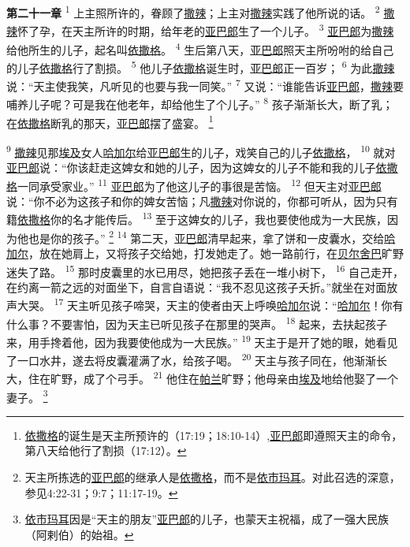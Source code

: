 \textbf{第二十一章\quad}
\textsuperscript{1}
上主照所许的，眷顾了\uline{撒辣}；上主对\uline{撒辣}实践了他所说的话。
\textsuperscript{2}
\uline{撒辣}怀了孕，在天主所许的时期，给年老的\uline{亚巴郎}生了一个儿子。
\textsuperscript{3}
\uline{亚巴郎}为\uline{撒辣}给他所生的儿子，起名叫\uline{依撒格}。
\textsuperscript{4}
生后第八天，\uline{亚巴郎}照天主所吩咐的给自己的儿子\uline{依撒格}行了割损。
\textsuperscript{5}
他儿子\uline{依撒格}诞生时，\uline{亚巴郎}正一百岁；
\textsuperscript{6}
为此\uline{撒辣}说：“天主使我笑，凡听见的也要与我一同笑。”
\textsuperscript{7}
又说：“谁能告诉\uline{亚巴郎}，\uline{撒辣}要哺养儿子呢？可是我在他老年，却给他生了个儿子。”
\textsuperscript{8}
孩子渐渐长大，断了乳；在\uline{依撒格}断乳的那天，\uline{亚巴郎}摆了盛宴。
\footnote{\uline{依撒格}的诞生是天主所预许的（17:19；18:10-14）,\uline{亚巴郎}即遵照天主的命令，第八天给他行了割损（17:12）。}

\textsuperscript{9}
\uline{撒辣}见那\uline{埃及}女人\uline{哈加尔}给\uline{亚巴郎}生的儿子，戏笑自己的儿子\uline{依撒格}，
\textsuperscript{10}
就对\uline{亚巴郎}说：“你该赶走这婢女和她的儿子，因为这婢女的儿子不能和我的儿子\uline{依撒格}一同承受家业。”
\textsuperscript{11}
\uline{亚巴郎}为了他这儿子的事很是苦恼。
\textsuperscript{12}
但天主对\uline{亚巴郎}说：“你不必为这孩子和你的婢女苦恼；凡\uline{撒辣}对你说的，你都可听从，因为只有籍\uline{依撒格}你的名才能传后。
\textsuperscript{13}
至于这婢女的儿子，我也要使他成为一大民族，因为他也是你的孩子。”
\footnote{天主所拣选的\uline{亚巴郎}的继承人是\uline{依撒格}，而不是\uline{依市玛耳}。对此召选的深意，参见4:22-31；9:7；11:17-19。}
\textsuperscript{14}
第二天，\uline{亚巴郎}清早起来，拿了饼和一皮囊水，交给\uline{哈加尔}，放在她肩上，又将孩子交给她，打发她走了。她一路前行，在\uline{贝尔}\uline{舍巴}旷野迷失了路。
\textsuperscript{15}
那时皮囊里的水已用尽，她把孩子丢在一堆小树下，
\textsuperscript{16}
自己走开，在约离一箭之远的对面坐下，自言自语说：“我不忍见这孩子夭折。”就坐在对面放声大哭。
\textsuperscript{17}
天主听见孩子啼哭，天主的使者由天上呼唤\uline{哈加尔}说：“\uline{哈加尔}！你有什么事？不要害怕，因为天主已听见孩子在那里的哭声。
\textsuperscript{18}
起来，去扶起孩子来，用手搀着他，因为我要使他成为一大民族。”
\textsuperscript{19}
天主于是开了她的眼，她看见了一口水井，遂去将皮囊灌满了水，给孩子喝。
\textsuperscript{20}
天主与孩子同在，他渐渐长大，住在旷野，成了个弓手。
\textsuperscript{21}
他住在\uline{帕兰}旷野；他母亲由\uline{埃及}地给他娶了一个妻子。
\footnote{\uline{依市玛耳}因是“天主的朋友”\uline{亚巴郎}的儿子，也蒙天主祝福，成了一强大民族（阿剌伯）的始祖。}

